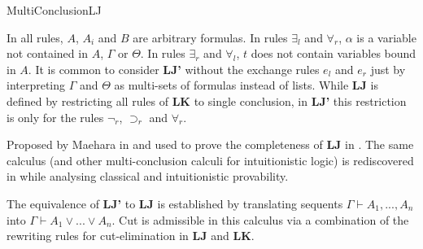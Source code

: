 \begin{entry}{MultiConclusionLJ}

\begin{clarifications}
In all rules, $A$, $A_i$ and $B$ are arbitrary formulas. In rules $\exists_l$
and $\forall_r$, $\alpha$ is a variable not contained in $A$, $\Gamma$ or
$\Theta$. In rules $\exists_r$ and $\forall_l$, $t$ does not contain variables
bound in $A$.
It is common to consider \textbf{LJ'} without the exchange rules $e_l$ and $e_r$ just by
interpreting $\Gamma$ and $\Theta$ as multi-sets of formulas instead of lists.
While \textbf{LJ} is defined by restricting all rules of
\textbf{LK} to single conclusion, in \textbf{LJ'} this
restriction is only for the rules $\neg_r$, $\supset_r$ and $\forall_r$.
\end{clarifications}

\begin{history}
Proposed by Maehara in \cite{Maehara1954} and used to prove the completeness of
\textbf{LJ} in \cite{Takeuti1987}. The same calculus (and other
multi-conclusion calculi for intuitionistic logic) is rediscovered in
\cite{Nadathur1998} while analysing classical and intuitionistic provability.
\end{history}

\begin{technicalities}
The equivalence of \textbf{LJ'} to \textbf{LJ} is established by translating
sequents $\Gamma \vdash A_1, ..., A_n$ into $\Gamma \vdash A_1 \vee ... \vee
A_n$. Cut is admissible in this calculus via a combination of the rewriting
rules for cut-elimination in \textbf{LJ} and \textbf{LK}.
\end{technicalities}







\end{entry}
